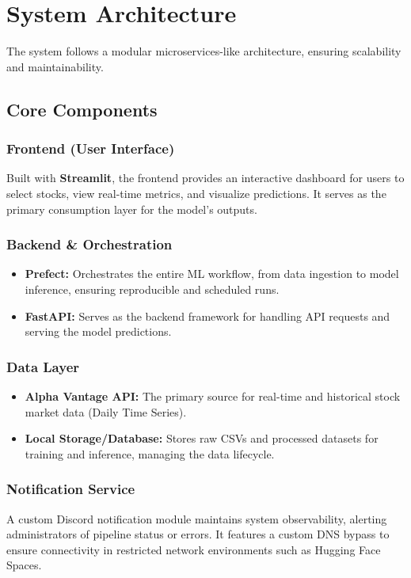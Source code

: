 \documentclass[conference]{IEEEtran}
\begin{document}
\section{System Architecture}
The system follows a modular microservices-like architecture, ensuring scalability and maintainability.

\subsection{Core Components}
\subsubsection{Frontend (User Interface)}
Built with \textbf{Streamlit}, the frontend provides an interactive dashboard for users to select stocks, view real-time metrics, and visualize predictions. It serves as the primary consumption layer for the model's outputs.

\subsubsection{Backend \& Orchestration}
\begin{itemize}
    \item \textbf{Prefect:} Orchestrates the entire ML workflow, from data ingestion to model inference, ensuring reproducible and scheduled runs.
    \item \textbf{FastAPI:} Serves as the backend framework for handling API requests and serving the model predictions.
\end{itemize}

\subsubsection{Data Layer}
\begin{itemize}
    \item \textbf{Alpha Vantage API:} The primary source for real-time and historical stock market data (Daily Time Series).
    \item \textbf{Local Storage/Database:} Stores raw CSVs and processed datasets for training and inference, managing the data lifecycle.
\end{itemize}

\subsubsection{Notification Service}
A custom Discord notification module maintains system observability, alerting administrators of pipeline status or errors. It features a custom DNS bypass to ensure connectivity in restricted network environments such as Hugging Face Spaces.
\end{document}
